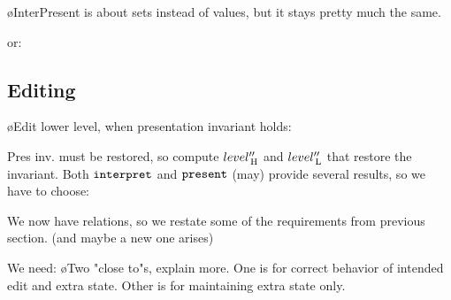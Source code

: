 \bl
\o {\sc InterPresent} is about sets instead of values, but it stays pretty much the same.
\el


or:




\subsection{Editing} \label{sect:singleExtra_Editing}

\bl
\o Edit lower level, when presentation invariant holds:
\el



Pres inv. must be restored, so compute $level''_{\, \mathrm H}$ and $level''_{\, \mathrm L}$ that restore the invariant. 
Both ${\tt interpret}$ and ${\tt present}$ (may) provide several results, so we have to choose:

We now have relations, so we restate some of the requirements from previous section. (and maybe a new one arises)

We need:
\bl
\o Two "close to"s, explain more. One is for correct behavior of intended edit and extra state. Other is for maintaining extra state only.
\el


